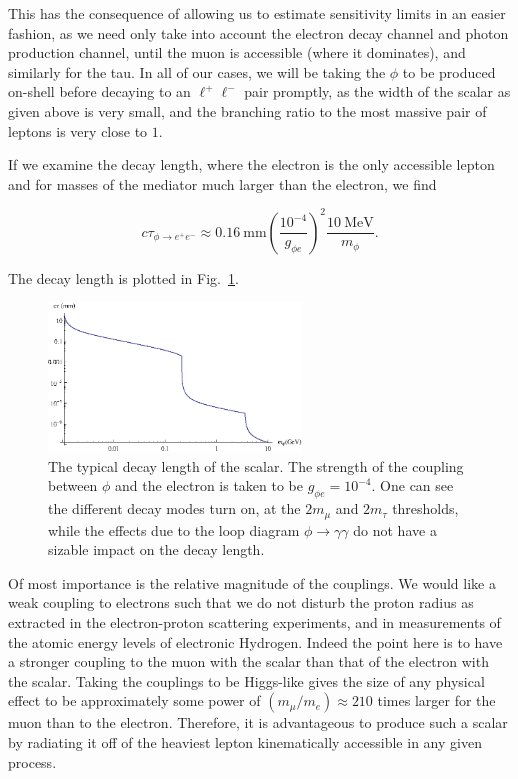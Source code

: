 This has the consequence of allowing us to estimate sensitivity limits in an easier fashion, as we need only take into account the electron decay channel and photon production channel, until the muon is accessible (where it dominates), and similarly for the tau.
In all of our cases, we will be taking the $\phi$ to be produced on-shell before decaying to an $\ell^+ \ell^-$ pair promptly, as the width of the scalar as given above is very small, and the branching ratio to the most massive pair of leptons is very close to $1$.

If we examine the decay length, where the electron is the only accessible lepton and for masses of the mediator much larger than the electron, we find

\begin{equation}
    c \tau_{\phi \rightarrow e^+ e^-} \approx 0.16~\textrm{mm} \left(\frac{10^{-4}}{g_{\phi e}}\right)^2 \frac{10~\textrm{MeV}}{m_\phi}\textrm{.}
\end{equation}

\noindent The decay length is plotted in Fig.\ \ref{fig:ctau_phi}.

\begin{figure}[h]
    \centering
    \includegraphics[width = 0.6\textwidth]{Figures/misc/ctau_phi}
    \caption[The typical decay length of the scalar.]{The typical decay length of the scalar. The strength of the coupling between $\phi$ and the electron is taken to be $g_{\phi e} = 10^{-4}$. One can see the different decay modes turn on, at the $2 m_\mu$ and $2 m_\tau$ thresholds, while the effects due to the loop diagram $\phi \rightarrow \gamma \gamma$ do not have a sizable impact on the decay length.}
    \label{fig:ctau_phi}
\end{figure}

Of most importance is the relative magnitude of the couplings.
We would like a weak coupling to electrons such that we do not disturb the proton radius as extracted in the electron-proton scattering experiments, and in measurements of the atomic energy levels of electronic Hydrogen.
Indeed the point here is to have a stronger coupling to the muon with the scalar than that of the electron with the scalar.
Taking the couplings to be Higgs-like gives the size of any physical effect to be approximately some power of $(m_\mu/m_e) \approx 210$ times larger for the muon than to the electron.
Therefore, it is advantageous to produce such a scalar by radiating it off of the heaviest lepton kinematically accessible in any given process.

